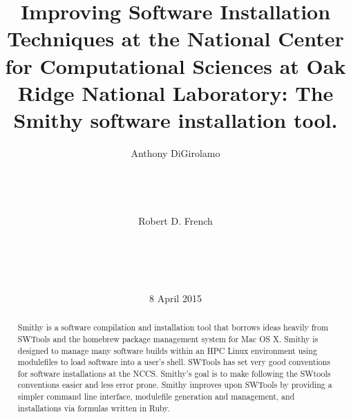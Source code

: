\documentclass{acm_proc_article-sp}
\begin{document}
\title{Improving Software Installation Techniques at the National Center for Computational Sciences at Oak Ridge National Laboratory: The Smithy software installation tool.}


%
\author{
\alignauthor
Anthony DiGirolamo\\ %
       \\
       \\
       \\
       \\
\alignauthor
Robert D. French\\ %
       \\
       \\
       \\
       \\
}

\date{8 April 2015}

\maketitle

\begin{abstract}

Smithy is a software compilation and installation tool that borrows ideas
heavily from SWTools\cite{swtools} and the homebrew\cite{homebrew} package
management system for Mac OS X.  Smithy is designed to manage many software
builds within an HPC Linux environment using modulefiles to load software into a
user's shell.  SWTools has set very good conventions for software installations
at the NCCS.  Smithy's goal is to make following the SWtools conventions easier
and less error prone.  Smithy improves upon SWTools by providing a simpler
command line interface, modulefile generation and management, and installations
via formulas written in Ruby.

\end{abstract}
\end{document}
